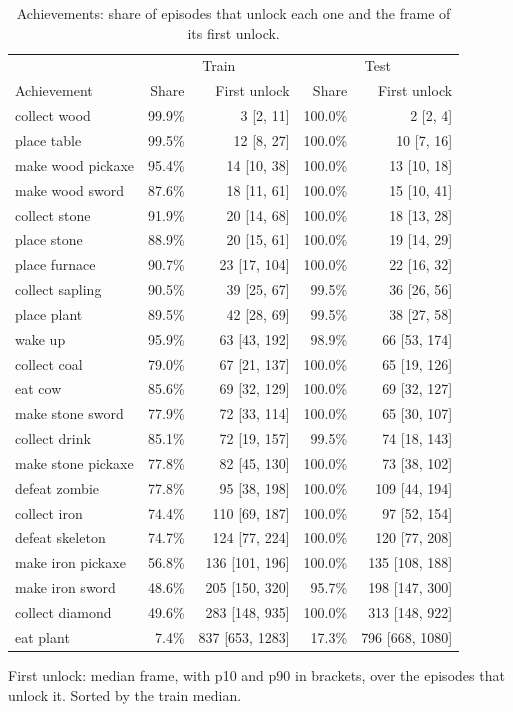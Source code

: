 \begin{table}[H]
\centering
\caption{Achievements: share of episodes that unlock each one and the frame of its first unlock.}
\label{tab:data-achievements}
\small
\setlength{\tabcolsep}{3.5pt}
\begin{tabular}{lrrrr}
\toprule
& \multicolumn{2}{c}{Train} & \multicolumn{2}{c}{Test} \\
 Achievement & Share & First unlock & Share & First unlock \\
\midrule
collect wood & 99.9\% & 3 [2, 11] & 100.0\% & 2 [2, 4] \\
place table & 99.5\% & 12 [8, 27] & 100.0\% & 10 [7, 16] \\
make wood pickaxe & 95.4\% & 14 [10, 38] & 100.0\% & 13 [10, 18] \\
make wood sword & 87.6\% & 18 [11, 61] & 100.0\% & 15 [10, 41] \\
collect stone & 91.9\% & 20 [14, 68] & 100.0\% & 18 [13, 28] \\
place stone & 88.9\% & 20 [15, 61] & 100.0\% & 19 [14, 29] \\
place furnace & 90.7\% & 23 [17, 104] & 100.0\% & 22 [16, 32] \\
collect sapling & 90.5\% & 39 [25, 67] & 99.5\% & 36 [26, 56] \\
place plant & 89.5\% & 42 [28, 69] & 99.5\% & 38 [27, 58] \\
wake up & 95.9\% & 63 [43, 192] & 98.9\% & 66 [53, 174] \\
collect coal & 79.0\% & 67 [21, 137] & 100.0\% & 65 [19, 126] \\
eat cow & 85.6\% & 69 [32, 129] & 100.0\% & 69 [32, 127] \\
make stone sword & 77.9\% & 72 [33, 114] & 100.0\% & 65 [30, 107] \\
collect drink & 85.1\% & 72 [19, 157] & 99.5\% & 74 [18, 143] \\
make stone pickaxe & 77.8\% & 82 [45, 130] & 100.0\% & 73 [38, 102] \\
defeat zombie & 77.8\% & 95 [38, 198] & 100.0\% & 109 [44, 194] \\
collect iron & 74.4\% & 110 [69, 187] & 100.0\% & 97 [52, 154] \\
defeat skeleton & 74.7\% & 124 [77, 224] & 100.0\% & 120 [77, 208] \\
make iron pickaxe & 56.8\% & 136 [101, 196] & 100.0\% & 135 [108, 188] \\
make iron sword & 48.6\% & 205 [150, 320] & 95.7\% & 198 [147, 300] \\
collect diamond & 49.6\% & 283 [148, 935] & 100.0\% & 313 [148, 922] \\
eat plant & 7.4\% & 837 [653, 1283] & 17.3\% & 796 [668, 1080] \\
\bottomrule
\end{tabular}

\vspace{4pt}
\begin{minipage}{\linewidth}
\footnotesize\raggedright First unlock: median frame, with p10 and p90 in brackets, over the episodes that unlock it. Sorted by the train median.
\end{minipage}
\end{table}

